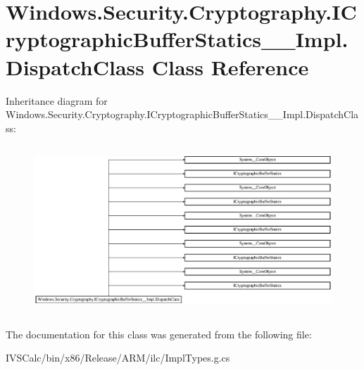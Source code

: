 \hypertarget{class_windows_1_1_security_1_1_cryptography_1_1_i_cryptographic_buffer_statics_____impl_1_1_dispatch_class}{}\section{Windows.\+Security.\+Cryptography.\+I\+Cryptographic\+Buffer\+Statics\+\_\+\+\_\+\+Impl.\+Dispatch\+Class Class Reference}
\label{class_windows_1_1_security_1_1_cryptography_1_1_i_cryptographic_buffer_statics_____impl_1_1_dispatch_class}
Inheritance diagram for Windows.\+Security.\+Cryptography.\+I\+Cryptographic\+Buffer\+Statics\+\_\+\+\_\+\+Impl.\+Dispatch\+Class\+:\begin{figure}[H]
\begin{center}
\leavevmode
\includegraphics[height=6.376812cm]{class_windows_1_1_security_1_1_cryptography_1_1_i_cryptographic_buffer_statics_____impl_1_1_dispatch_class}
\end{center}
\end{figure}


The documentation for this class was generated from the following file\+:\begin{DoxyCompactItemize}
\item 
I\+V\+S\+Calc/bin/x86/\+Release/\+A\+R\+M/ilc/Impl\+Types.\+g.\+cs\end{DoxyCompactItemize}
